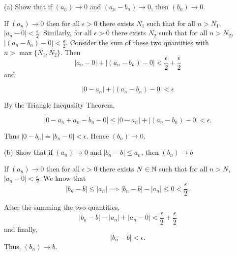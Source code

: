 \documentclass{report}
\begin{document}
(a) Show that if $\left(a_n\right) \rightarrow 0$ and $\left(a_n-b_n\right) \rightarrow 0$, then $\left(b_n\right) \rightarrow 0$.
\begin{myproof}
    
  If $\left(a_n\right) \rightarrow 0$ then for all $\epsilon >0$ there exists $N_1$ such that for all $n> N_1$, $|a_n - 0| < \frac{\epsilon}{2}.$ Similarly, for all $\epsilon >0$ there exists $N_2$ such that for all $n > N_2$, $| (a_n - b_n) - 0 |< \frac{\epsilon}{2}.$ Consider the sum of these two quantities with $n > \max\{N_1,N_2\}.$ Then 
$$| a_n  - 0 |+ | (a_n - b_n) - 0 |<  \frac{\epsilon}{2} + \frac{\epsilon}{2}$$ and

$$| 0 - a_n |+ | (a_n - b_n) - 0 |<  \epsilon$$

By the Triangle Inequality Theorem, 

$$|0 - a_n  + a_n - b_n - 0 | \leq | 0 - a_n |+ | (a_n - b_n) - 0 |< \epsilon.$$

Thus $|0 - b_n| = |b_n - 0 |< \epsilon.$ Hence $(b_n) \rightarrow 0.$

\end{myproof}


\bigskip
(b) Show that if $\left(a_n\right) \rightarrow 0$ and $\left|b_n-b\right| \leq a_n$, then $\left(b_n\right) \rightarrow b$

\begin{myproof}
    
  If $(a_n) \rightarrow 0 $ then for all $\epsilon > 0 $ there exists
$N \in \NN$ such that for all $n > N$, $|a_n - 0| < \frac{\epsilon}{2}.$ We know that $$|b_n - b| \leq |a_n|  \implies |b_n - b| - |a_n|\leq 0 < \frac{\epsilon}{2}.$$

After the summing the two quantities,
 $$|b_n - b| - |a_n| + |a_n -0| < \frac{\epsilon}{2} + \frac{\epsilon}{2}$$
 and finally,
 $$|b_n - b|  < \epsilon.$$ Thus, $(b_n) \rightarrow b.$

\end{myproof}

\end{document}
